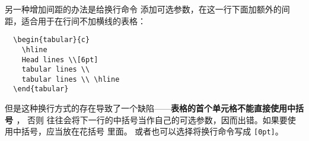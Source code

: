 另一种增加间距的办法是给换行命令 \crcmd{} 添加可选参数，在这一行下面加额外的间距，适合用于在行间不加横线的表格：
\begin{lstlisting}
  \begin{tabular}{c}
    \hline
    Head lines \\[6pt]
    tabular lines \\
    tabular lines \\ \hline
  \end{tabular}
\end{lstlisting}
\begin{center}
\end{center}

但是这种换行方式的存在导致了一个缺陷——{\bf{表格的首个单元格不能直接使用中括号 \text{[~]}}}，
否则 \crcmd{} 往往会将下一行的中括号当作自己的可选参数，因而出错。如果要使用中括号，应当放在花括号 \marg*{} 里面。
或者也可以选择将换行命令写成 \crcmd\texttt{[0pt]}。
































